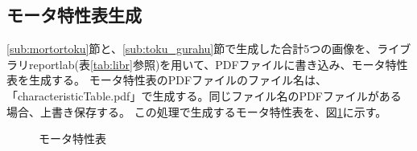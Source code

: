 \subsection{モータ特性表生成}\label{sub:a}
\ref{sub:mortortoku}節と、\ref{sub:toku_gurahu}節で生成した合計5つの画像を、ライブラリreportlab(表\ref{tab:libr}参照)を用いて、PDFファイルに書き込み、モータ特性表を生成する。
モータ特性表のPDFファイルのファイル名は、「characteristicTable.pdf」で生成する。同じファイル名のPDFファイルがある場合、上書き保存する。
この処理で生成するモータ特性表を、図\ref{fig:tokuseihyou}に示す。
\begin{figure}[t]
	\centering
	\caption{モータ特性表}
	\label{fig:tokuseihyou}
\end{figure}